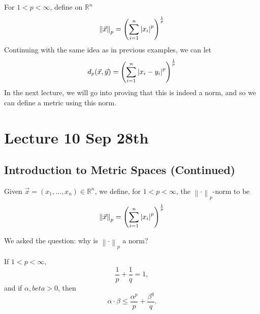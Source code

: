 \documentclass[notoc,notitlepage]{tufte-book}
\newcommand{\norm}[1]{\left\| #1 \right\|}
\begin{document}
\begin{eg}
  For $1 < p < \infty$, define on $\mathbb{R}^n$
  \begin{equation*}
    \norm{\vec{x}}_p = \left( \sum_{i=1}^{n} \abs{x_i}^p \right)^\frac{1}{p}
  \end{equation*}
  Continuing with the same idea as in previous examples, we can let
  \begin{equation*}
    d_p(\vec{x}, \vec{y}) = \left( \sum_{i=1}^{n} \left|x_i - y_i\right|^p \right)^\frac{1}{p}
  \end{equation*}
  In the next lecture, we will go into proving that this is indeed a norm, and so we can define a metric using this norm.
\end{eg}



\chapter{Lecture 10 Sep 28th}%
\label{chp:lecture_10_sep_28th}

\section{Introduction to Metric Spaces (Continued)}%
\label{sec:introduction_to_metric_spaces_continued}

\begin{defn}[$\norm\cdot_p$-norm]\index{$\norm\cdot_p$-norm}\label{defn:p_norm}
  Given $\vec{x} = ( x_1, \ldots, x_n ) \in \mathbb{R}^n$, we define, for $1 < p < \infty$, the $\norm\cdot_p$-norm to be
  \begin{equation*}
    \norm{\vec{x}}_p = \left( \sum_{i=1}^{n} \abs{x_i}^p \right)^{\frac{1}{p}}
  \end{equation*}
\end{defn}

We asked the question: why is $\norm\cdot_p$ a norm?

\begin{lemma}\label{lemma:young_s_inequality}
  If $1 < p < \infty$,
  \begin{equation*}
    \frac{1}{p} + \frac{1}{q} = 1,
  \end{equation*}
  and if $\alpha, beta > 0$, then
  \begin{equation*}
    \alpha \cdot \beta \leq \frac{\alpha^p}{p} + \frac{\beta^q}{q}.
  \end{equation*}
\end{lemma}
\end{document}
